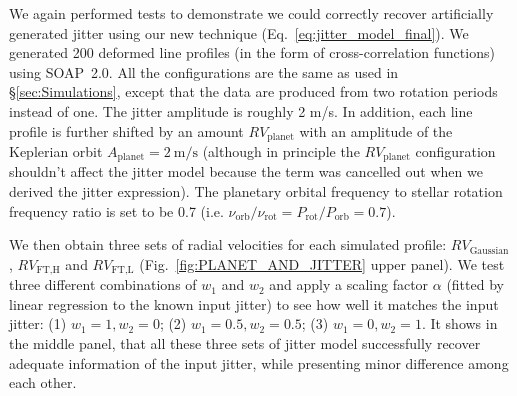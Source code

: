 We again performed tests to demonstrate we could correctly recover artificially generated jitter using our new technique (Eq.~\ref{eq:jitter_model_final}). We generated 200 deformed line profiles (in the form of cross-correlation functions) using SOAP~2.0. All the configurations are the same as used in \S\ref{sec:Simulations}, except that the data are produced from two rotation periods instead of one. The jitter amplitude is roughly 2 m/s. In addition, each line profile is further shifted by an amount $RV_\text{planet}$ with an amplitude of the Keplerian orbit $A_\text{planet} = 2~\text{m/s}$ (although in principle the $RV_\text{planet}$ configuration shouldn't affect the jitter model because the term was cancelled out when we derived the jitter expression). The planetary orbital frequency to stellar rotation frequency ratio is set to be 0.7 (i.e. $\nu_\text{orb}/\nu_\text{rot} = P_\text{rot}/P_\text{orb} = 0.7$). 

We then obtain three sets of radial velocities for each simulated profile: $RV_\text{Gaussian}$, $RV_\text{FT,H}$ and $RV_\text{FT,L}$ (Fig.~\ref{fig:PLANET_AND_JITTER} upper panel). We test three different combinations of $w_1$ and $w_2$ and apply a scaling factor $\alpha$ (fitted by linear regression to the known input jitter) to see how well it matches the input jitter: (1) $w_1=1, w_2=0$; (2) $w_1=0.5, w_2=0.5$; (3) $w_1=0, w_2=1$. It shows in the middle panel, that all these three sets of jitter model successfully recover adequate information of the input jitter, while presenting minor difference among each other. 

